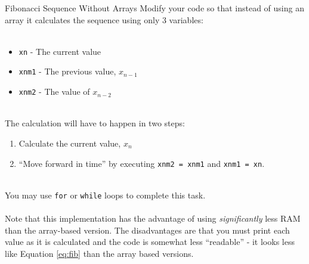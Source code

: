 \documentclass{lab}
\begin{document}
\begin{task}{Fibonacci Sequence Without Arrays}{}
Modify your code so that instead of using an array it calculates the sequence using only 3 variables:
\\~
\begin{itemize}
\item \texttt{xn} - The current value
\item \texttt{xnm1} - The previous value, $x_{n-1}$
\item \texttt{xnm2} - The value of $x_{n-2}$
\end{itemize}
~\\
The calculation will have to happen in two steps:
\\
\begin{enumerate}
\item Calculate the current value, $x_n$
\item ``Move forward in time'' by executing \texttt{xnm2 = xnm1} and \texttt{xnm1 = xn}.
\end{enumerate}
~\\
You may use \texttt{for} or \texttt{while} loops to complete this task.
\\~\\
Note that this implementation has the advantage of using \textit{significantly} less RAM than the array-based version. The disadvantages are that you must print each value as it is calculated and the code is somewhat less ``readable'' - it looks less like Equation \ref{eq:fib} than the array based versions.
\end{task}
\end{document}
